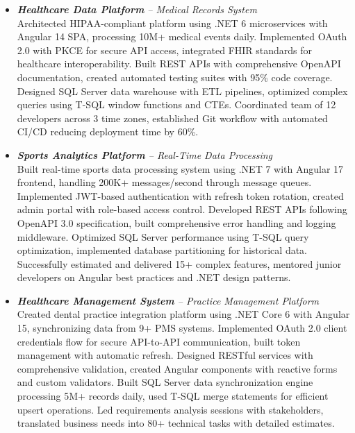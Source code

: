 \documentclass[11pt,a4paper,sans]{moderncv}
\begin{document}
{\begin{itemize}
\begin{itemize}
      \item \textit{\textbf{Healthcare Data Platform} – Medical Records System}\\
        Architected HIPAA-compliant platform using .NET 6 microservices with Angular 14 SPA, processing 10M+ medical
        events daily. Implemented OAuth 2.0 with PKCE for secure API access, integrated FHIR standards for healthcare
        interoperability. Built REST APIs with comprehensive OpenAPI documentation, created automated testing suites with
        95\% code coverage. Designed SQL Server data warehouse with ETL pipelines, optimized complex queries using T-SQL
        window functions and CTEs. Coordinated team of 12 developers across 3 time zones, established Git workflow with
        automated CI/CD reducing deployment time by 60\%.

      \item \textit{\textbf{Sports Analytics Platform} – Real-Time Data Processing}\\
        Built real-time sports data processing system using .NET 7 with Angular 17 frontend, handling 200K+ messages/second
        through message queues. Implemented JWT-based authentication with refresh token rotation, created admin portal with
        role-based access control. Developed REST APIs following OpenAPI 3.0 specification, built comprehensive error
        handling and logging middleware. Optimized SQL Server performance using T-SQL query optimization, implemented
        database partitioning for historical data. Successfully estimated and delivered 15+ complex features, mentored
        junior developers on Angular best practices and .NET design patterns.

      \item \textit{\textbf{Healthcare Management System} – Practice Management Platform}\\
        Created dental practice integration platform using .NET Core 6 with Angular 15, synchronizing data from 9+ PMS
        systems. Implemented OAuth 2.0 client credentials flow for secure API-to-API communication, built token management
        with automatic refresh. Designed RESTful services with comprehensive validation, created Angular components with
        reactive forms and custom validators. Built SQL Server data synchronization engine processing 5M+ records daily,
        used T-SQL merge statements for efficient upsert operations. Led requirements analysis sessions with stakeholders,
        translated business needs into 80+ technical tasks with detailed estimates.
    \end{itemize}
\end{itemize}}
\end{document}
